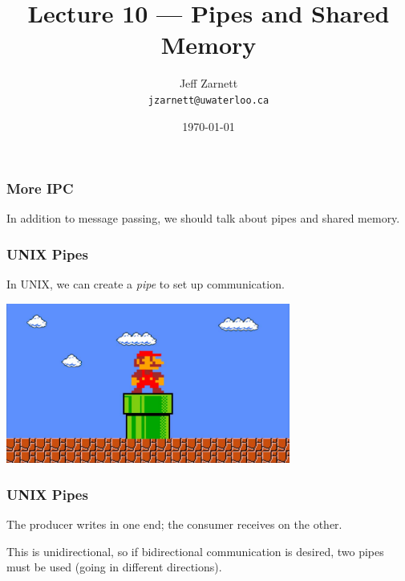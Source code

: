 

\title{Lecture 10 --- Pipes and Shared Memory}

\author{Jeff Zarnett \\ \small \texttt{jzarnett@uwaterloo.ca}}
\date{\today}




\begin{frame}
  \titlepage

 \end{frame}

\begin{frame}
\frametitle{More IPC}

In addition to message passing, we should talk about pipes and shared memory.


\end{frame}


\begin{frame}
\frametitle{UNIX Pipes}

In UNIX, we can create a \textit{pipe} to set up communication. 

\begin{center}
	\includegraphics[width=0.7\textwidth]{images/mario-pipe.jpg}
\end{center}

\end{frame}

\begin{frame}
\frametitle{UNIX Pipes}




The producer writes in one end; the consumer receives on the other. 

This is unidirectional, so if bidirectional communication is desired, two pipes must be used (going in different directions). 

\end{frame}


